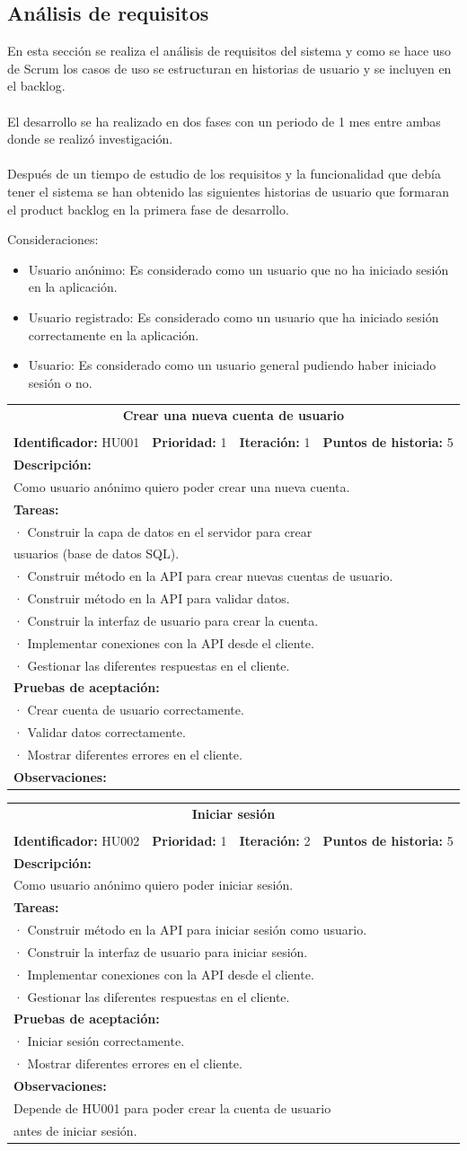 \documentclass[14pt]{extarticle}
\theoremstyle{definition}
\theoremstyle{remark}
\newcommand{\newtableitem}[1] {
	\multicolumn{4}{|l|}{· #1} \\
}
\newcommand{\newtableline}[1] { %
	\multicolumn{4}{|l|}{#1} \\
}
\newcommand{\userstory}[9]{
	\begin{center}
	\resizebox{15cm}{!} {
	\begin{tabular}{|c|c|c|c|}
    	\hline 
		\multicolumn{4}{|c|}{\textbf{#1}} \\
		\multicolumn{4}{|c|}{} \\
		\hline	
		\textbf{Identificador:} #2 & \textbf{Prioridad:} #3 & \textbf{Iteración:} #4 & \textbf{Puntos de historia:} #5 \\ 
		\hline 
		\multicolumn{4}{|l|}{\textbf{Descripción:}} \\
		#6
		\hline 
		\multicolumn{4}{|l|}{\textbf{Tareas:}} \\
		#7
		\hline 
		\multicolumn{4}{|l|}{\textbf{Pruebas de aceptación:}} \\
		#8
		\hline 
		\multicolumn{4}{|l|}{\textbf{Observaciones:}} \\
		#9
		\hline 
	\end{tabular}
	}
	\end{center}
}
\begin{document}
\subsection{Análisis de requisitos}\label{sec:analisisderequisitos}
En esta sección se realiza el análisis de requisitos del sistema y como se hace uso de Scrum los casos de uso se estructuran en historias de usuario y se incluyen en el backlog.\\\\El desarrollo se ha realizado en dos fases con un periodo de 1 mes entre ambas donde se realizó investigación.\\\\Después de un tiempo de estudio de los requisitos y la funcionalidad que debía tener el sistema se han obtenido las siguientes historias de usuario que formaran el product backlog en la primera fase de desarrollo.

Consideraciones:
\begin{itemize}
	\item Usuario anónimo: Es considerado como un usuario que no ha iniciado sesión en la aplicación.
	\item Usuario registrado: Es considerado como un usuario que ha iniciado sesión correctamente en la aplicación.
	\item Usuario: Es considerado como un usuario general pudiendo haber iniciado sesión o no.
\end{itemize}

\userstory {Crear una nueva cuenta de usuario}
{HU001}{1}{1}{5}
{\newtableline {Como usuario anónimo quiero poder crear una nueva cuenta.}}
{ %
	\newtableitem {Construir la capa de datos en el servidor para crear }
		\newtableline {usuarios (base de datos SQL).}
	\newtableitem {Construir método en la API para crear nuevas cuentas de usuario.}
	\newtableitem {Construir método en la API para validar datos.}
	\newtableitem {Construir la interfaz de usuario para crear la cuenta.}
	\newtableitem {Implementar conexiones con la API desde el cliente.}
	\newtableitem {Gestionar las diferentes respuestas en el cliente.}
}
{ %
	\newtableitem {Crear cuenta de usuario correctamente.}
	\newtableitem {Validar datos correctamente.}
	\newtableitem {Mostrar diferentes errores en el cliente.}
}
{ %

}

\userstory {Iniciar sesión}
{HU002}{1}{2}{5}
{\newtableline {Como usuario anónimo quiero poder iniciar sesión.}}
{ %
	\newtableitem {Construir método en la API para iniciar sesión como usuario.}
	\newtableitem {Construir la interfaz de usuario para iniciar sesión.}
	\newtableitem {Implementar conexiones con la API desde el cliente.}
	\newtableitem {Gestionar las diferentes respuestas en el cliente.}
}
{ %
	\newtableitem {Iniciar sesión correctamente.}
	\newtableitem {Mostrar diferentes errores en el cliente.}
}
{ %
	\newtableline {Depende de HU001 para poder crear la cuenta de usuario} 
	\newtableline{ antes de iniciar sesión.}
}
\end{document}
